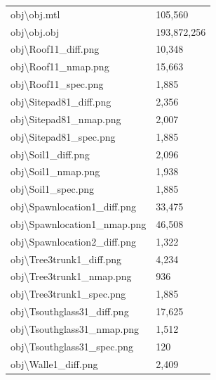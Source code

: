 \begin{longtable}{p{}p{}}
obj\textbackslash{}\allowbreak{}obj.\allowbreak{}mtl & 105,560 \\
obj\textbackslash{}\allowbreak{}obj.\allowbreak{}obj & 193,872,256 \\
obj\textbackslash{}\allowbreak{}Roof11\_\allowbreak{}diff.\allowbreak{}png & 10,348 \\
obj\textbackslash{}\allowbreak{}Roof11\_\allowbreak{}nmap.\allowbreak{}png & 15,663 \\
obj\textbackslash{}\allowbreak{}Roof11\_\allowbreak{}spec.\allowbreak{}png & 1,885 \\
obj\textbackslash{}\allowbreak{}Sitepad81\_\allowbreak{}diff.\allowbreak{}png & 2,356 \\
obj\textbackslash{}\allowbreak{}Sitepad81\_\allowbreak{}nmap.\allowbreak{}png & 2,007 \\
obj\textbackslash{}\allowbreak{}Sitepad81\_\allowbreak{}spec.\allowbreak{}png & 1,885 \\
obj\textbackslash{}\allowbreak{}Soil1\_\allowbreak{}diff.\allowbreak{}png & 2,096 \\
obj\textbackslash{}\allowbreak{}Soil1\_\allowbreak{}nmap.\allowbreak{}png & 1,938 \\
obj\textbackslash{}\allowbreak{}Soil1\_\allowbreak{}spec.\allowbreak{}png & 1,885 \\
obj\textbackslash{}\allowbreak{}Spawnlocation1\_\allowbreak{}diff.\allowbreak{}png & 33,475 \\
obj\textbackslash{}\allowbreak{}Spawnlocation1\_\allowbreak{}nmap.\allowbreak{}png & 46,508 \\
obj\textbackslash{}\allowbreak{}Spawnlocation2\_\allowbreak{}diff.\allowbreak{}png & 1,322 \\
obj\textbackslash{}\allowbreak{}Tree3trunk1\_\allowbreak{}diff.\allowbreak{}png & 4,234 \\
obj\textbackslash{}\allowbreak{}Tree3trunk1\_\allowbreak{}nmap.\allowbreak{}png & 936 \\
obj\textbackslash{}\allowbreak{}Tree3trunk1\_\allowbreak{}spec.\allowbreak{}png & 1,885 \\
obj\textbackslash{}\allowbreak{}Tsouthglass31\_\allowbreak{}diff.\allowbreak{}png & 17,625 \\
obj\textbackslash{}\allowbreak{}Tsouthglass31\_\allowbreak{}nmap.\allowbreak{}png & 1,512 \\
obj\textbackslash{}\allowbreak{}Tsouthglass31\_\allowbreak{}spec.\allowbreak{}png & 120 \\
obj\textbackslash{}\allowbreak{}Walle1\_\allowbreak{}diff.\allowbreak{}png & 2,409 \\

\end{longtable}
